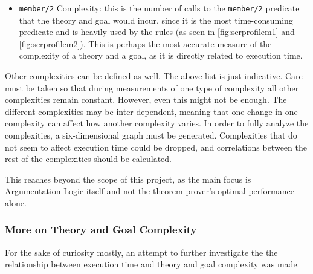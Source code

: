 \documentclass[11pt,twoside,a4paper]{report}
\begin{document}
\begin{itemize}
\item
\lstinline$member/2$ Complexity: this is the number of calls to the \lstinline$member/2$ predicate that the theory and goal would incur, since it is the most time-consuming predicate and is heavily used by the rules (as seen in \autoref{fig:scrprofilem1} and \autoref{fig:scrprofilem2}). This is perhaps the most accurate measure of the complexity of a theory and a goal, as it is directly related to execution time.
\end{itemize}

Other complexities can be defined as well. The above list is just indicative. Care must be taken so that during measurements of one type of complexity all other complexities remain constant. However, even this might not be enough. The different complexities may be inter-dependent, meaning that one change in one complexity can affect how another complexity varies. In order to fully analyze the complexities, a six-dimensional graph must be generated. Complexities that do not seem to affect execution time could be dropped, and correlations between the rest of the complexities should be calculated.

This reaches beyond the scope of this project, as the main focus is Argumentation Logic itself and not the theorem prover's optimal performance alone. 

\subsubsection{More on Theory and Goal Complexity}
For the sake of curiosity mostly, an attempt to further investigate the the relationship between execution time and theory and goal complexity was made.
\end{document}
